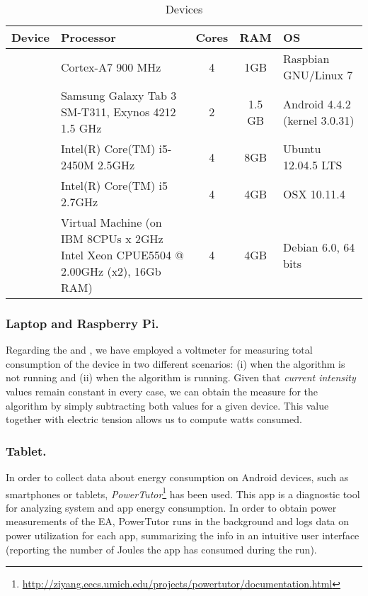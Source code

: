 \begin{table}[!t]
\centering
\caption{Devices}
\label{Table:devices}
\begin{tabular}{lp{4.5cm}ccp{3cm}} \hline
Device		&	Processor			&	Cores	&	RAM &	OS		\\ 
\hline
\raspberry   	& Cortex-A7 900 MHz			&	 4 	&	1GB &	Raspbian GNU/Linux 7	\\
\tablet		& Samsung Galaxy Tab 3 SM-T311, Exynos 4212 1.5 GHz& 2  & 1.5 GB &	Android	4.4.2 (kernel 3.0.31) \\
\laptop 		& Intel(R) Core(TM) i5-2450M 2.5GHz	&	4	&	8GB &	Ubuntu 12.04.5 LTS \\
\iMac		& Intel(R) Core(TM) i5 2.7GHz	& 4	& 4GB 	&OSX 10.11.4			\\
\blade		& Virtual Machine (on IBM 8CPUs x 2GHz Intel Xeon CPUE5504 @ 2.00GHz (x2), 16Gb RAM) & 4 & 4GB & Debian 6.0, 64 bits\\
\hline
\end{tabular}
\end{table}


\subsubsection*{Laptop and Raspberry Pi.}
Regarding the \laptop and \raspberrynsp, we have employed a voltmeter for measuring total consumption of the device in two different scenarios:  (i) when the algorithm is not running and (ii) when the algorithm is running.  Given that \emph{current intensity} values remain constant in every case, we can obtain the measure for the algorithm by simply subtracting both values for a given device.  This value together with electric tension allows us to compute watts consumed.

\subsubsection*{Tablet.}
In order to collect data about energy consumption on Android devices, such as smartphones or tablets, \emph{PowerTutor}\footnote{\url{http://ziyang.eecs.umich.edu/projects/powertutor/documentation.html}} \cite{powertutor2} has been used. 
This app is a diagnostic tool for analyzing system and app energy consumption.
In order to obtain power measurements of the EA, PowerTutor runs in the background and logs data on power utilization for each app, summarizing the info in an intuitive user interface (reporting the number of Joules the app has consumed during the run).


